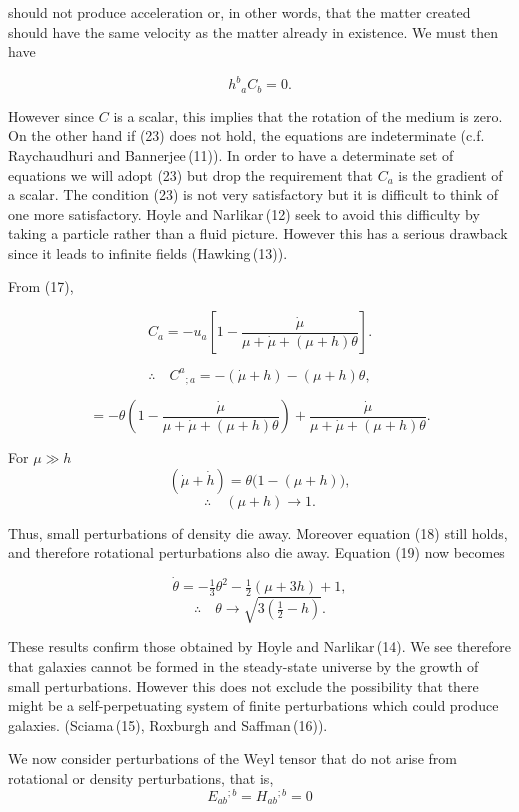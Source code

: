 should not produce acceleration or, in other words, that the matter 
created should have the same velocity as the matter already in 
existence. We must then have

\[
h^{b}{}_{a} C_{b} = 0. \tag{23}
\]

However since $C$ is a scalar, this implies that the rotation of the 
medium is zero. On the other hand if (23) does not hold, the equations 
are indeterminate (c.f. Raychaudhuri and Bannerjee\,(11)). In order to 
have a determinate set of equations we will adopt (23) but drop the 
requirement that $C_{a}$ is the gradient of a scalar. The condition (23) 
is not very satisfactory but it is difficult to think of one more 
satisfactory. Hoyle and Narlikar\,(12) seek to avoid this difficulty 
by taking a particle rather than a fluid picture. However this has a 
serious drawback since it leads to infinite fields (Hawking\,(13)).

From (17),

\[
C_{a} = -u_{a}\left[1 - \frac{\dot{\mu}}{\mu + \dot{\mu} + (\mu + h)\theta}\right].
\]

\[
\therefore \quad C^{a}{}_{;a} = -(\dot{\mu}+h) - (\mu+h)\theta,
\]

\[
= -\theta\left(1 - \frac{\dot{\mu}}{\mu + \dot{\mu} + (\mu + h)\theta}\right)
+ \frac{\dot{\mu}}{\mu + \dot{\mu} + (\mu + h)\theta}.
\]


For $\mu \gg h$
\[
(\dot{\mu} + \dot{h}) = \theta \big(1 - (\mu + h)\big),
\]
\[
\therefore \quad (\mu + h) \to 1.
\]

Thus, small perturbations of density die away. Moreover equation (18) 
still holds, and therefore rotational perturbations also die away.  
Equation (19) now becomes

\[
\dot{\theta} = -\tfrac{1}{3}\theta^{2} - \tfrac{1}{2}(\mu + 3h) + 1,
\]
\[
\therefore \quad \theta \to \sqrt{3\left(\tfrac{1}{2} - h\right)}.
\]

These results confirm those obtained by Hoyle and Narlikar\,(14). We 
see therefore that galaxies cannot be formed in the steady-state 
universe by the growth of small perturbations. However this does not 
exclude the possibility that there might be a self-perpetuating 
system of finite perturbations which could produce galaxies.  
(Sciama\,(15), Roxburgh and Saffman\,(16)).


We now consider perturbations of the Weyl tensor that do not 
arise from rotational or density perturbations, that is,
\[
E_{ab}{}^{;b} = H_{ab}{}^{;b} = 0
\]

